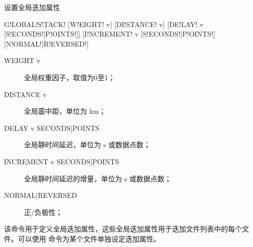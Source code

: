 \label{sss:globalstack}

设置全局迭加属性

\begin{SACSTX}
G!LOBAL!S!TACK! [W!EIGHT! v] [DI!STANCE! v] [DE!LAY! v [S!ECONDS!|P!OINTS!]]
    [I!NCREMENT! v [S!ECONDS!|P!OINTS!] [N!ORMAL!|R!EVERSED!]
\end{SACSTX}

\begin{description}
\item [WEIGHT v] 全局权重因子，取值为0至1；
\item [DISTANCE v] 全局震中距，单位为 \si{km}；
\item [DELAY v SECONDS|POINTS] 全局静时间延迟，单位为 \si{\s} 或数据点数；
\item [INCREMENT v SECONDS|POINTS] 全局静时间延迟的增量，单位为 \si{\s} 或数据点数；
\item [NORMAL|REVERSED] 正/负极性；
\end{description}

该命令用于定义全局迭加属性，这些全局迭加属性用于迭加文件列表中的每个文件。可以使用
命令为某个文件单独设定迭加属性。
